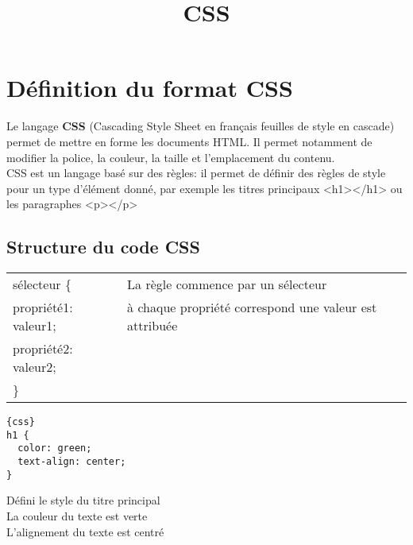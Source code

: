 \documentclass[a4paper,11pt]{article}
\begin{document}
\title{CSS}
\date{}
\maketitle

\section{Définition du format CSS}
Le langage \textbf{CSS} (Cascading Style Sheet en français feuilles de style en cascade) permet de mettre en forme les documents HTML. Il permet notamment de modifier la police, la couleur, la taille et l'emplacement du contenu.\\
CSS est un langage basé sur des règles: il permet de définir des règles de style pour un type d'élément donné, par exemple les titres principaux <h1></h1> ou les paragraphes <p></p>

\subsection{Structure du code CSS}
\begin{tabular}{l l}
sélecteur \{ & La règle commence par un sélecteur\\
\quad propriété1: valeur1;  & à chaque propriété correspond une valeur est attribuée\\
\quad propriété2: valeur2; & \\
\}& \\
\end{tabular}

\begin{multicols}{2}
\begin{verbatim}{css}
h1 {
  color: green;
  text-align: center;
}
\end{verbatim}\par
Défini le style du titre principal\\
La couleur du texte est verte\\
L'alignement du texte est centré\\
\end{multicols}

\end{document}
